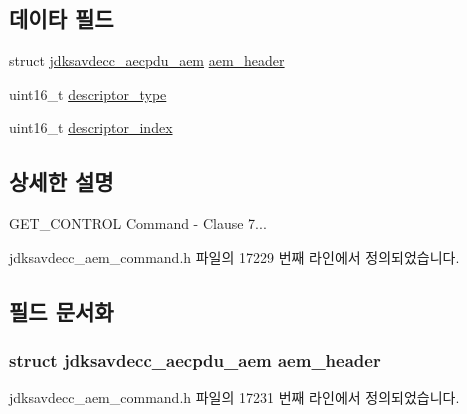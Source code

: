 \subsection*{데이타 필드}
\begin{DoxyCompactItemize}
\item 
struct \hyperlink{structjdksavdecc__aecpdu__aem}{jdksavdecc\+\_\+aecpdu\+\_\+aem} \hyperlink{structjdksavdecc__aem__command__get__control_ae1e77ccb75ff5021ad923221eab38294}{aem\+\_\+header}
\item 
uint16\+\_\+t \hyperlink{structjdksavdecc__aem__command__get__control_ab7c32b6c7131c13d4ea3b7ee2f09b78d}{descriptor\+\_\+type}
\item 
uint16\+\_\+t \hyperlink{structjdksavdecc__aem__command__get__control_a042bbc76d835b82d27c1932431ee38d4}{descriptor\+\_\+index}
\end{DoxyCompactItemize}


\subsection{상세한 설명}
G\+E\+T\+\_\+\+C\+O\+N\+T\+R\+OL Command -\/ Clause 7... 

jdksavdecc\+\_\+aem\+\_\+command.\+h 파일의 17229 번째 라인에서 정의되었습니다.



\subsection{필드 문서화}
\subsubsection[{\texorpdfstring{aem\+\_\+header}{aem_header}}]{\setlength{\rightskip}{0pt plus 5cm}struct {\bf jdksavdecc\+\_\+aecpdu\+\_\+aem} aem\+\_\+header}\hypertarget{structjdksavdecc__aem__command__get__control_ae1e77ccb75ff5021ad923221eab38294}{}\label{structjdksavdecc__aem__command__get__control_ae1e77ccb75ff5021ad923221eab38294}


jdksavdecc\+\_\+aem\+\_\+command.\+h 파일의 17231 번째 라인에서 정의되었습니다.


